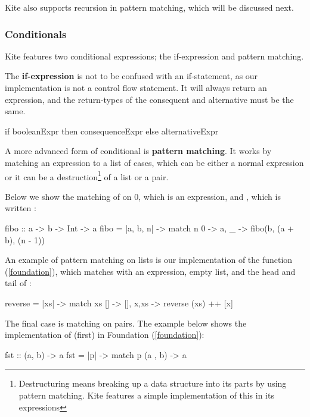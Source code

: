 Kite also supports recursion in pattern matching, which will be discussed next.

\subsubsection{Conditionals}
\label{subsubsec:conditionals}
Kite features two conditional expressions; the if-expression and pattern matching.

The \textbf{if-expression} is not to be confused with an if-statement, as our implementation is not a control flow statement. It will always return an expression, and the return-types of the consequent and alternative must be the same.

\begin{kite}
if booleanExpr then consequenceExpr else alternativeExpr
\end{kite}

A more advanced form of conditional is \textbf{pattern matching}. It works by matching an expression to a list of cases, which can be either a normal expression or it can be a destruction\footnote{Destructuring means breaking up a data structure into its parts by using pattern matching. Kite features a simple implementation of this in its  expressions} of a list or a pair.

Below we show the matching of  on 0, which is an expression, and , which is written :

\begin{kite}
fibo :: a -> b -> Int -> a
fibo = |a, b, n| -> {
  match n {
    0 -> a,
    _ -> fibo(b, (a + b), (n - 1))
  }
}
\end{kite}

An example of pattern matching on lists is our implementation of the function  (\ref{foundation}), which matches  with an expression, empty list, and the head and tail of :

\begin{kite}
reverse = |xs| -> {
  match xs {
    []    -> [],
    x,xs  -> reverse (xs) ++ [x]
  }
}
\end{kite}

\newpage

The final case is matching on pairs. The example below shows the implementation of  (first) in Foundation (\ref{foundation}):
\begin{kite}
fst :: (a, b) -> a
fst = |p| -> {
  match p {
    (a , b) -> a
  }
}
\end{kite}

